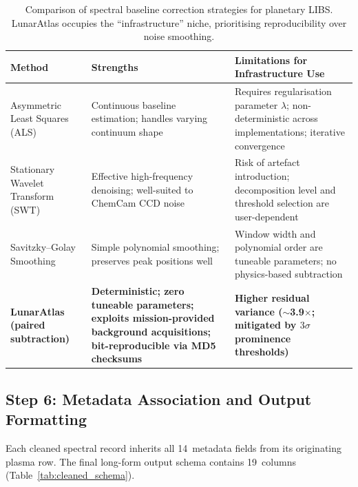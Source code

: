 \documentclass[a4paper,twocolumn,10pt]{article}
\begin{document}
\begin{table}[!t]
\centering
\caption{Comparison of spectral baseline correction strategies for
  planetary LIBS.  LunarAtlas occupies the ``infrastructure'' niche,
  prioritising reproducibility over noise smoothing.}
\label{tab:method_comp}
\begin{tabularx}{\textwidth}{l X X}
\toprule
\textbf{Method} & \textbf{Strengths} & \textbf{Limitations for Infrastructure Use} \\
\midrule
Asymmetric Least Squares (ALS)~\cite{Clegg2017} & Continuous baseline estimation;
  handles varying continuum shape & Requires regularisation parameter
  $\lambda$; non-deterministic across implementations; iterative convergence \\
\addlinespace
Stationary Wavelet Transform (SWT)~\cite{Anderson2022} & Effective high-frequency
  denoising; well-suited to ChemCam CCD noise & Risk of artefact introduction;
  decomposition level and threshold selection are user-dependent \\
\addlinespace
Savitzky--Golay Smoothing~\cite{Sridhar2025} & Simple polynomial smoothing;
  preserves peak positions well & Window width and polynomial order
  are tuneable parameters; no physics-based subtraction \\
\addlinespace
\textbf{LunarAtlas (paired subtraction)} & \textbf{Deterministic;
  zero tuneable parameters; exploits mission-provided background
  acquisitions; bit-reproducible via MD5 checksums} & \textbf{Higher residual
  variance ($\sim$3.9$\times$; mitigated by $3\sigma$ prominence thresholds)} \\
\bottomrule
\end{tabularx}
\end{table}

\subsection{Step 6: Metadata Association and Output Formatting}

Each cleaned spectral record inherits all 14~metadata fields from its
originating plasma row.  The final long-form output schema contains
19~columns (Table~\ref{tab:cleaned_schema}).
\end{document}
